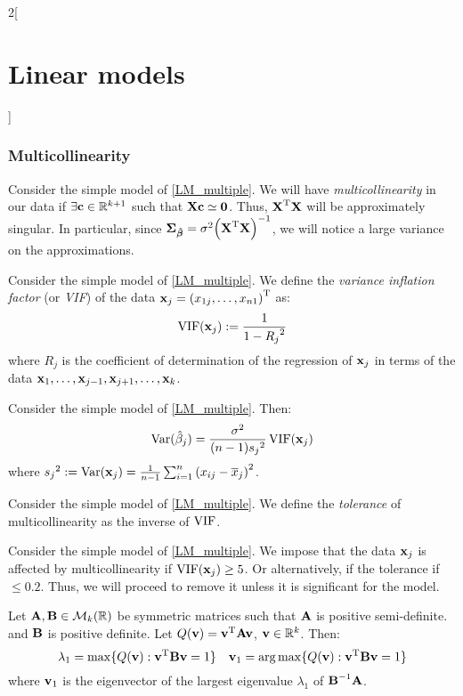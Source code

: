 \documentclass[../../../main_math.tex]{subfiles}
\begin{document}
\begin{multicols}{2}[\section{Linear models}]
  \subsubsection{Multicollinearity}
  \begin{definition}
    Consider the simple model of \cref{LM_multiple}. We will have \emph{multicollinearity} in our data if $\exists \boldsymbol{\mathrm{c}}\in\mathbb{R}^{k+1}$ such that $\boldsymbol{\mathrm{Xc}}\simeq \boldsymbol{\mathrm{0}}$. Thus, ${\boldsymbol{\mathrm{X}}}^{\mathrm{T}}\boldsymbol{\mathrm{X}}$ will be approximately singular. In particular, since $\boldsymbol{\mathrm{\Sigma}}_{\boldsymbol{\mathrm{\hat\beta}}}=\sigma^2{\left({\boldsymbol{\mathrm{X}}}^{\mathrm{T}}\boldsymbol{\mathrm{X}}\right)}^{-1}$, we will notice a large variance on the approximations.
  \end{definition}
  \begin{definition}
    Consider the simple model of \cref{LM_multiple}. We define the \emph{variance inflation factor} (or \emph{VIF}) of the data $\boldsymbol{\mathrm{x}}_j={(x_{1j},\ldots,x_{n1})}^{\mathrm{T}}$ as: $$\operatorname{VIF}(\boldsymbol{\mathrm{x}}_j):=\frac{1}{1-{R_j}^2}$$ where ${R_j}$ is the coefficient of determination of the regression of $\boldsymbol{\mathrm{x}}_j$ in terms of the data $\boldsymbol{\mathrm{x}}_1,\ldots,\boldsymbol{\mathrm{x}}_{j-1},\boldsymbol{\mathrm{x}}_{j+1},\ldots,\boldsymbol{\mathrm{x}}_k$.
  \end{definition}
  \begin{lemma}
    Consider the simple model of \cref{LM_multiple}. Then: $$\mathrm{Var}(\hat\beta_j)=\frac{\sigma^2}{(n-1) {s_j}^2}\operatorname{VIF}(\boldsymbol{\mathrm{x}}_j)$$ where ${s_j}^2:=\mathrm{Var}(\boldsymbol{\mathrm{x}}_j)=\frac{1}{n-1}\sum_{i=1}^n{(x_{ij}-\overline{x}_j)}^2$.
  \end{lemma}
  \begin{definition}
    Consider the simple model of \cref{LM_multiple}. We define the \emph{tolerance} of multicollinearity as the inverse of $\operatorname{VIF}$.
  \end{definition}
  \begin{definition}
    Consider the simple model of \cref{LM_multiple}.  We impose that the data $\boldsymbol{\mathrm{x}}_j$ is affected by multicollinearity if $\operatorname{VIF}(\boldsymbol{\mathrm{x}}_j)\ge 5$. Or alternatively, if the tolerance if $\leq 0.2$. Thus, we will proceed to remove it unless it is significant for the model.
  \end{definition}
  \begin{theorem}
    Let $\boldsymbol{\mathrm{A}},\boldsymbol{\mathrm{B}}\in\mathcal{M}_k(\mathbb{R})$ be symmetric matrices such that $\boldsymbol{\mathrm{A}}$ is positive semi-definite. and $\boldsymbol{\mathrm{B}}$ is positive definite. Let $Q(\boldsymbol{\mathrm{v}})={\boldsymbol{\mathrm{v}}}^{\mathrm{T}}\boldsymbol{\mathrm{Av}}$, $\boldsymbol{\mathrm{v}}\in\mathbb{R}^k$. Then:
    $$\lambda_1=\max\{Q(\boldsymbol{\mathrm{v}}):{\boldsymbol{\mathrm{v}}}^{\mathrm{T}}\boldsymbol{\mathrm{Bv}}=1\}\quad \boldsymbol{\mathrm{v}}_1=\operatorname*{arg\,max}\{Q(\boldsymbol{\mathrm{v}}):{\boldsymbol{\mathrm{v}}}^{\mathrm{T}}\boldsymbol{\mathrm{Bv}}=1\}$$
    where $\boldsymbol{\mathrm{v}}_1$ is the eigenvector of the largest eigenvalue $\lambda_1$ of $\boldsymbol{\mathrm{B}}^{-1}\boldsymbol{\mathrm{A}}$.

\end{theorem}
\end{multicols}
\end{document}
